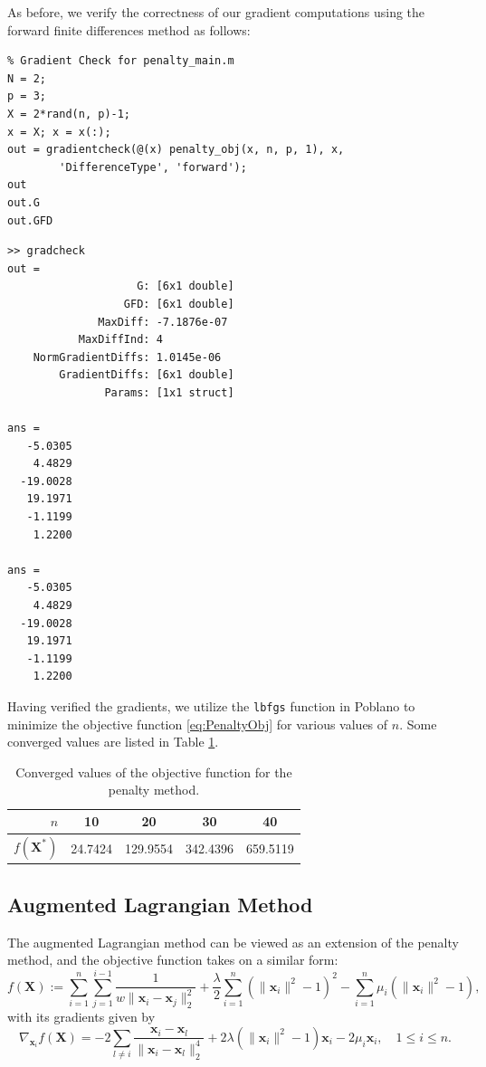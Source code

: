\documentclass[11pt]{article}
\begin{document}
As before, we verify the correctness of our gradient computations using the forward finite differences method as follows:

\begin{lstlisting}
% Gradient Check for penalty_main.m
N = 2;
p = 3;
X = 2*rand(n, p)-1;
x = X; x = x(:);
out = gradientcheck(@(x) penalty_obj(x, n, p, 1), x,
		'DifferenceType', 'forward');
out
out.G
out.GFD
\end{lstlisting}

\begin{verbatim}
>> gradcheck
out = 
                    G: [6x1 double]
                  GFD: [6x1 double]
              MaxDiff: -7.1876e-07
           MaxDiffInd: 4
    NormGradientDiffs: 1.0145e-06
        GradientDiffs: [6x1 double]
               Params: [1x1 struct]

ans =
   -5.0305
    4.4829
  -19.0028
   19.1971
   -1.1199
    1.2200

ans =
   -5.0305
    4.4829
  -19.0028
   19.1971
   -1.1199
    1.2200
\end{verbatim}

\noindent Having verified the gradients, we utilize the \texttt{lbfgs} function in Poblano to minimize the objective function \eqref{eq:PenaltyObj} for various values of $n$. Some converged values are listed in Table \ref{tb:ObjReg}.

\begin{table}[ht]
  \centering
  \begin{tabular}{rcccc}
	\toprule
	$n$ & 10 & 20 & 30 & 40 \\
	\midrule
	$f(\bm{X}^*)$ & 24.7424 & 129.9554 & 342.4396 & 659.5119 \\
	\bottomrule
  \end{tabular}
  \caption{Converged values of the objective function for the penalty method.}
  \label{tb:ObjReg}
\end{table}

\subsection{Augmented Lagrangian Method}

The augmented Lagrangian method can be viewed as an extension of the penalty method, and the objective function takes on a similar form:
\begin{equation}\label{eq:RegObj}
f(\bm{X}) := \sum_{i=1}^n\sum_{j=1}^{i-1}\frac{1}{w\|\bm{x}_i-\bm{x}_j\|_2^2} + \frac{\lambda}{2} \sum_{i=1}^n \left(\|\bm{x}_i\|^2-1\right)^2 - \sum_{i=1}^n \mu_i\left(\|\bm{x}_i\|^2-1\right),
\end{equation}
with its gradients given by
\begin{equation}\label{eq:gradient}
\nabla_{\bm{x}_i} f(\bm{X}) = -2\sum_{l\neq i} \frac{\bm{x}_i-\bm{x}_l}{\|\bm{x}_i-\bm{x}_l\|_2^4} + 2\lambda\left(\|\bm{x}_i\|^2-1\right)\bm{x}_i - 2\mu_i\bm{x}_i, \quad 1\le i\le n.
\end{equation}
\end{document}
